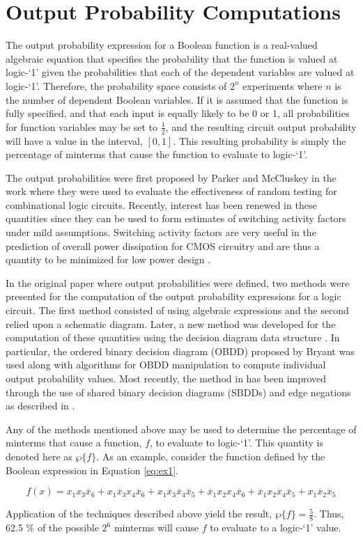 \section{Output Probability Computations}
The output probability expression for a Boolean function is a real-valued
algebraic equation that specifies the probability that the function 
is valued at logic-`1' given the probabilities that each of the dependent variables
are valued at logic-`1'.  
Therefore, the probability
space consists of $2^n$ experiments where $n$ is the number of dependent
Boolean variables.  
If it is assumed that the function is fully specified,
and that each input is equally likely to be 0 or 1, all probabilities for
function variables may be set to $\frac{1}{2}$, and the resulting circuit
output probability will have a value in the interval, $[0,1]$.
This resulting probability is simply the percentage of minterms that
cause the function to evaluate to logic-`1'.

The output probabilities were first proposed by Parker and McCluskey
in the work \cite{PM75} where they were used to evaluate the effectiveness of
random testing for combinational logic circuits.  Recently, interest has been
renewed in these quantities 
since they can be used to form estimates of switching activity factors
under
mild assumptions.  Switching activity factors are very
useful in the prediction of overall power dissipation for CMOS 
circuitry and are thus a quantity to be minimized for low 
power design \cite{GDKW92} \cite{MP96} \cite{TPD93}.

In the original paper \cite{PM75} where output probabilities were defined, 
two methods were presented for the computation
of the output probability expressions for a logic circuit.  The first method
consisted of using algebraic expressions and the second relied upon a schematic
diagram.  Later, a new method was developed for the computation of these quantities
using the decision diagram data structure \cite{TN94e}.  In particular, the 
ordered binary decision diagram (OBDD) proposed by Bryant \cite{RB86} was used
along with algorithms for OBDD manipulation to compute individual output
probability values.  Most recently, the method in \cite{TN94e} has been improved
through the use of shared binary decision diagrams (SBDDs) and edge negations
as described in \cite{DM95}.

Any of the methods mentioned above may be used to determine
the percentage of minterms that cause a function, $f$, to evaluate to logic-`1'.
This quantity is denoted here as $\wp \{ f \}$.  As an example, consider the function
defined by the Boolean expression in Equation \ref{eq:ex1}.

\begin{equation}
f(x) = x_1 x_3 \overline{x}_6 + x_1 \overline{x}_3 x_4 \overline{x}_6
+ x_1 \overline{x}_3 \overline{x}_4 \overline{x}_5
+ \overline{x}_1 x_2 x_4 \overline{x}_6
+ \overline{x}_1 x_2 \overline{x}_4 \overline{x}_5
+ x_1 \overline{x}_2 \overline{x}_5    \label{eq:ex1}
\end{equation}

Application of the techniques described above yield the result, $\wp \{ f \} = \frac{5}{8}$.
Thus, 62.5 \% of the possible $2^6$ minterms will cause $f$ to evaluate to a logic-`1' value.

